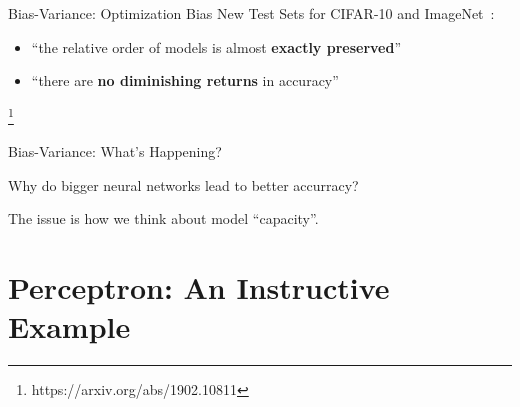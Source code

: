 \documentclass[notheorems]{beamer}
\newcommand{\source}[1]{{\let\thefootnote\relax\footnote{{\tiny #1}}}}
\begin{document}
\begin{frame}{Bias-Variance: Optimization Bias}
        New Test Sets for CIFAR-10 and ImageNet~\cite{recht2019imagenet}:
        \begin{itemize}
            \item ``the relative order of models is almost \textbf{exactly preserved}''
            \item ``there are \textbf{no diminishing returns} in accuracy''
        \end{itemize}

        \source{https://arxiv.org/abs/1902.10811}
    \end{frame}

    \begin{frame}{Bias-Variance: What's Happening?}
        \begin{center}
            {\huge Why do bigger neural networks lead to better accurracy? \vspace{1cm}\\ }

            {\huge The issue is how we think about model ``capacity''. \vspace{1cm}\\ }
        \end{center}


    \end{frame}

    \section{Perceptron: An Instructive Example}
\end{document}
